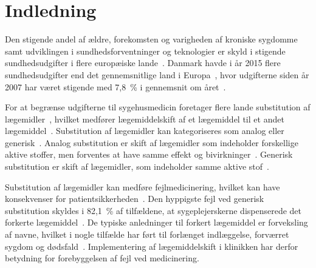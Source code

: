 \chapter{Indledning}
Den stigende andel af ældre, forekomsten og varigheden af kroniske sygdomme samt udviklingen i sundhedsforventninger og teknologier er skyld i stigende sundhedsudgifter i flere europæiske lande~\citep{Ess2003}. Danmark havde i år 2015 flere sundhedsudgifter end det gennemsnitlige land i Europa~\citep{EU2017}, hvor udgifterne siden år 2007 har været stigende med 7,8~\% i gennemsnit om året~\citep{Sundhed2016}.

For at begrænse udgifterne til sygehusmedicin foretager flere lande substitution af lægemidler~\citep{Ess2003,Johnston2011}, hvilket medfører lægemiddelskift af et lægemiddel til et andet lægemiddel~\citep{DanskSelskabforPatientsikkerhed2009, Kairi2017}. %
Substitution af lægemidler kan kategoriseres som analog eller generisk~\citep{DanskSelskabforPatientsikkerhed2009}.  
Analog substitution er skift af lægemidler som indeholder forskellige aktive stoffer, men forventes at have samme effekt og bivirkninger~\citep{DanskSelskabforPatientsikkerhed2009,Kairi2017}. 
Generisk substitution er skift af lægemidler, som indeholder samme aktive stof~\citep{DanskSelskabforPatientsikkerhed2009,Kairi2017}. 

Substitution af lægemidler kan medføre fejlmedicinering, hvilket kan have konsekvenser for patientsikkerheden~\citep{Hakonsen2010}. Den hyppigste fejl ved generisk substitution skyldes i 82,1~\% af tilfældene, at sygeplejerskerne dispenserede det forkerte lægemiddel~\citep{Hakonsen2010}. De typiske anledninger til forkert lægemiddel er forveksling af navne, hvilket i nogle tilfælde har ført til forlænget indlæggelse, forværret sygdom og dødsfald~\citep{DanskSelskabforPatientsikkerhed2009}. Implementering af lægemiddelskift i klinikken har derfor betydning for forebyggelsen af fejl ved medicinering.

